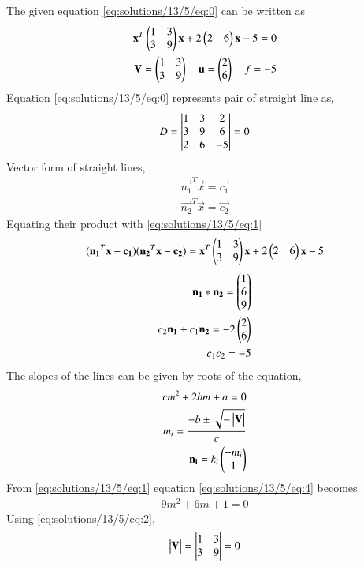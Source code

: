 The given equation \eqref{eq:solutions/13/5/eq:0} can be written as
\begin{align}
\mathbf{x}^T\begin{pmatrix}1 & 3 \\ 3 & 9\end{pmatrix}\mathbf{x} +2\begin{pmatrix}2 &6\end{pmatrix}\mathbf{x}-5=0\label{eq:solutions/13/5/eq:1}\\
\mathbf{V} = \begin{pmatrix}1 & 3 \\ 3 & 9\end{pmatrix} \quad \mathbf{u} = \begin{pmatrix}2 \\ 6\end{pmatrix} \quad f= -5 \label{eq:solutions/13/5/eq:2}
\end{align}
Equation \eqref{eq:solutions/13/5/eq:0} represents pair of straight line as,
\begin{align}
D = \begin{vmatrix}1&3&2\\3&9&6\\2&6&-5\end{vmatrix} = 0
\end{align}
Vector form of straight lines,
\begin{align}
\vec{n_1}^T\vec{x}= \vec{c_1}\\
\vec{n_2}^T\vec{x} = \vec{c_2}
\end{align}
Equating their product with \eqref{eq:solutions/13/5/eq:1}
\begin{align}
(\mathbf{n_1}^T\mathbf{x} -\mathbf{c_1})(\mathbf{n_2}^T\mathbf{x} - \mathbf{c_2})= \mathbf{x}^T\begin{pmatrix}1 & 3 \\ 3 & 9\end{pmatrix}\mathbf{x} +2\begin{pmatrix}2 &6\end{pmatrix}\mathbf{x}-5
\end{align}
\begin{align}
\mathbf{n_1}*\mathbf{n_2}=\begin{pmatrix}1\\6\\9\end{pmatrix}\label{eq:solutions/13/5/eq:3}\\
c_2\mathbf{n_1}+c_1\mathbf{n_2} = -2\begin{pmatrix}2\\6\end{pmatrix}\\
c_1c_2 = -5
\end{align}
The slopes of the lines can be given by roots of the equation,
\begin{align} 
cm^2+2bm+a=0 \label{eq:solutions/13/5/eq:4}\\
m_i = \frac{-b\pm \sqrt{-\begin{vmatrix}\mathbf{V}\end{vmatrix}}}{c}\label{eq:solutions/13/5/eq:5}\\
\mathbf{n_i}=k_i\begin{pmatrix}-m_i\\1\end{pmatrix}\label{eq:solutions/13/5/eq:6}
\end{align}
From \eqref{eq:solutions/13/5/eq:1} equation \eqref{eq:solutions/13/5/eq:4} becomes
\begin{align}
9m^2+6m+1=0
\end{align}
Using \eqref{eq:solutions/13/5/eq:2},
\begin{align}
\begin{vmatrix}\mathbf{V}\end{vmatrix} = \begin{vmatrix}1 & 3\\ 3 & 9\end{vmatrix} = 0
\end{align}
